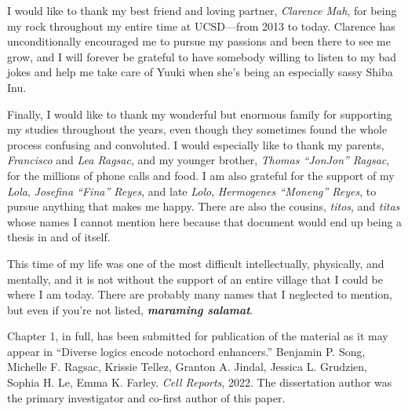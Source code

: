 \documentclass[11pt]{formatting-template}
\begin{document}
\begin{acknowledgements}
	I would like to thank my best friend and loving partner, \textit{Clarence Mah}, for being my rock throughout my entire time at UCSD—from 2013 to today. Clarence has unconditionally encouraged me to pursue my passions and been there to see me grow, and I will forever be grateful to have somebody willing to listen to my bad jokes and help me take care of Yuuki when she’s being an especially sassy Shiba Inu. 
	
	Finally, I would like to thank my wonderful but enormous family for supporting my studies throughout the years, even though they sometimes found the whole process confusing and convoluted. I would especially like to thank my parents, \textit{Francisco} and \textit{Lea Ragsac}, and my younger brother, \textit{Thomas “JonJon” Ragsac}, for the millions of phone calls and food. I am also grateful for the support of my \textit{Lola}, \textit{Josefina “Fina” Reyes}, and late \textit{Lolo}, \textit{Hermogenes “Moneng” Reyes}, to pursue anything that makes me happy. There are also the cousins, \textit{titos}, and \textit{titas} whose names I cannot mention here because that document would end up being a thesis in and of itself. 
	
	This time of my life was one of the most difficult intellectually, physically, and mentally, and it is not without the support of an entire village that I could be where I am today. There are probably many names that I neglected to mention, but even if you’re not listed, \textbf{\textit{maraming salamat}}.
	
	Chapter 1, in full, has been submitted for publication of the material as it may appear in “Diverse logics encode notochord enhancers.” Benjamin P. Song, Michelle F. Ragsac, Krissie Tellez, Granton A. Jindal, Jessica L. Grudzien, Sophia H. Le, Emma K. Farley. \textit{Cell Reports}, 2022. The dissertation author was the primary investigator and co-first author of this paper.
\end{acknowledgements}
\end{document}

